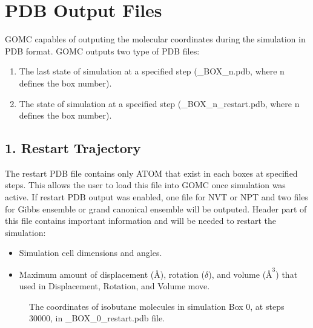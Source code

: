 \documentclass[letterpaper,10pt,english]{sphinxmanual}
\begin{document}
\section{PDB Output Files}
\label{\detokenize{output_file:pdb-output-files}}
GOMC capables of outputing the molecular coordinates during the simulation in PDB format.
GOMC outputs two type of PDB files:
\begin{enumerate}
%
\item {} 
The last state of simulation at a specified step (\_BOX\_n.pdb,
where n defines the box number).

\item {} 
The state of simulation at a specified step (\_BOX\_n\_restart.pdb,
where n defines the box number).

\end{enumerate}


\subsection{1.  Restart Trajectory}
\label{\detokenize{output_file:restart-trajectory}}
The restart PDB file contains only ATOM that exist in each boxes at specified steps. This allows the
user to load this file into GOMC once  simulation was active. If restart PDB output was enabled,
one file for NVT or NPT and two files for Gibbs ensemble or grand canonical ensemble will be outputed.
Header part of this file contains important information and will be needed to restart the simulation:
\begin{itemize}
\item {} 
Simulation cell dimensions and angles.

\item {} 
Maximum amount of displacement (Å), rotation (\(\delta\)), and volume (\(Å^3\)) that used in Displacement,
Rotation, and Volume move.

\end{itemize}

\begin{figure}[htbp]
\centering
\capstart

\noindent{}
\caption{The coordinates of isobutane molecules in simulation Box 0, at steps 30000, in \_BOX\_0\_restart.pdb file.}\label{\detokenize{output_file:id6}}\end{figure}
\end{document}
